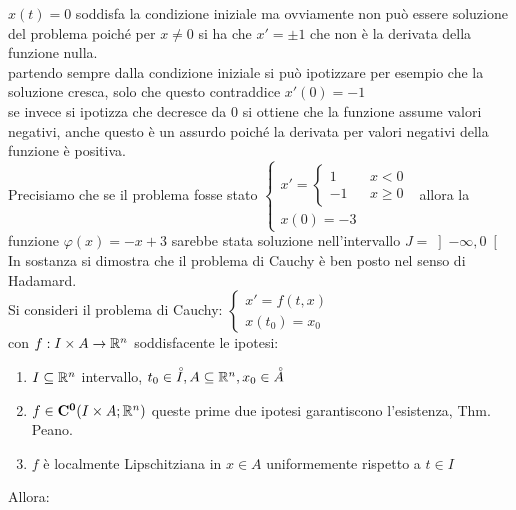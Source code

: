 \noindent $x(t)=0$ soddisfa la condizione iniziale ma ovviamente non può essere soluzione del problema poiché per $x\ne 0$ si ha che $ x'=\pm 1$ che non è la derivata della funzione nulla.\\
partendo sempre dalla condizione iniziale si può ipotizzare per esempio che la soluzione cresca, solo che questo contraddice $ x'(0)=-1$\\
se invece si ipotizza che decresce da $0$ si ottiene che la funzione assume valori negativi, anche questo è un assurdo poiché la derivata per valori negativi della funzione è positiva.\\
Precisiamo che se il problema fosse stato $\left\{\begin{matrix}
x' = \left\{\begin{matrix}1&&x<0\\-1&&x\ge 0\end{matrix}\right.\\
x(0)=-3\end{matrix}\right.$ allora la funzione $\varphi(x)=-x+3$ sarebbe stata soluzione nell'intervallo $J=\left] -\infty,0 \right[ $
In sostanza si dimostra che il problema di Cauchy è ben posto nel senso di Hadamard.\\
Si consideri il problema di Cauchy: 
$\left\{
\begin{matrix}
x'=f(t,x)\\x(t_0)=x_0
\end{matrix}
\right.$\\
con $f:I\times A \to \mathbb{R}^n$ soddisfacente le ipotesi:
\begin{enumerate}
	\item $I\subseteq \mathbb{R}^n$ intervallo, $t_0\in \accentset{\circ}{I}, A\subseteq \mathbb{R}^n, x_0\in \accentset{\circ}{A}$ 
	\item $f\in \mathbf{C^{0}}(I\times A; \mathbb{R}^n)$ queste prime due ipotesi garantiscono l'esistenza, Thm. Peano.
	\item $f$ è localmente Lipschitziana in $x\in A$ uniformemente rispetto a $t\in I$
\end{enumerate}
Allora:
